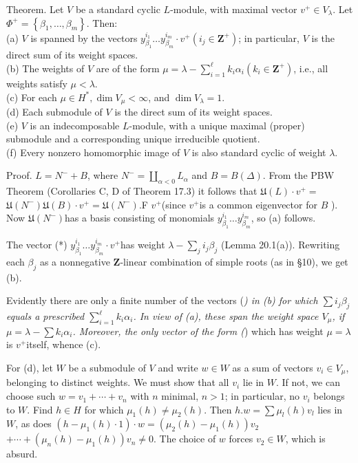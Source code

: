 \documentclass[10pt]{article}
\begin{document}
Theorem. Let $V$ be a standard cyclic $L$-module, with maximal vector $v^{+} \in V_{\lambda}$. Let $\Phi^{+}=\left\{\beta_{1}, \ldots, \beta_{m}\right\}$. Then:\\
(a) $V$ is spanned by the vectors $y_{\beta_{1}}^{i_{1}} \ldots y_{\beta_{m}}^{i_{m}} \cdot v^{+}\left(i_{j} \in \mathbf{Z}^{+}\right)$; in particular, $V$ is the direct sum of its weight spaces.\\
(b) The weights of $V$ are of the form $\mu=\lambda-\sum_{i=1}^{\ell} k_{i} \alpha_{i}\left(k_{i} \in \mathbf{Z}^{+}\right)$, i.e., all weights satisfy $\mu<\lambda$.\\
(c) For each $\mu \in H^{*}, \operatorname{dim} V_{\mu}<\infty$, and $\operatorname{dim} V_{\lambda}=1$.\\
(d) Each submodule of $V$ is the direct sum of its weight spaces.\\
(e) $V$ is an indecomposable $L$-module, with a unique maximal (proper) submodule and a corresponding unique irreducible quotient.\\
(f) Every nonzero homomorphic image of $V$ is also standard cyclic of weight $\lambda$.

Proof. $L=N^{-}+B$, where $N^{-}=\coprod_{\alpha<0} L_{\alpha}$ and $B=B(\Delta)$. From the PBW Theorem (Corollaries C, D of Theorem 17.3) it follows that $\mathfrak{U}(L) \cdot v^{+}=$ $\mathfrak{U}\left(N^{-}\right) \mathfrak{U}(B) \cdot v^{+}=\mathfrak{U}\left(N^{-}\right)$.F $v^{+}$(since $v^{+}$is a common eigenvector for $B$ ). Now $\mathfrak{U}\left(N^{-}\right)$has a basis consisting of monomials $y_{\beta_{1}}^{i_{1}} \ldots y_{\beta_{m}}^{i_{m}}$, so (a) follows.

The vector (*) $y_{\beta_{1}}^{i_{1}} \ldots y_{\beta_{m}}^{i_{m}} \cdot v^{+}$has weight $\lambda-\sum_{j} i_{j} \beta_{j}$ (Lemma 20.1(a)). Rewriting each $\beta_{j}$ as a nonnegative $\mathbf{Z}$-linear combination of simple roots (as in §10), we get (b).

Evidently there are only a finite number of the vectors (\textit{) in (b) for which $\sum i_{j} \beta_{j}$ equals a prescribed $\sum_{i=1}^{\ell} k_{i} \alpha_{i}$. In view of (a), these span the weight space $V_{\mu}$, if $\mu=\lambda-\sum k_{i} \alpha_{i}$. Moreover, the only vector of the form (}) which has weight $\mu=\lambda$ is $v^{+}$itself, whence (c).

For (d), let $W$ be a submodule of $V$ and write $w \in W$ as a sum of vectors $v_{i} \in V_{\mu}$, belonging to distinct weights. We must show that all $v_{i}$ lie in $W$. If not, we can choose such $w=v_{1}+\cdots+v_{n}$ with $n$ minimal, $n>1$; in particular, no $v_{i}$ belongs to $W$. Find $h \in H$ for which $\mu_{1}(h) \neq \mu_{2}(h)$. Then $h . w=\sum \mu_{l}(h) v_{l}$ lies in $W$, as does $\left(h-\mu_{1}(h) \cdot 1\right) \cdot w=\left(\mu_{2}(h)-\mu_{1}(h)\right) v_{2}$ $+\cdots+\left(\mu_{n}(h)-\mu_{1}(h)\right) v_{n} \neq 0$. The choice of $w$ forces $v_{2} \in W$, which is absurd.
\end{document}

